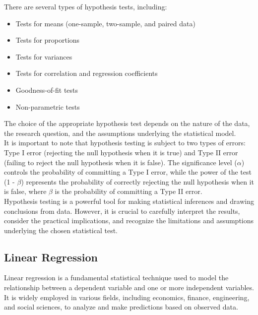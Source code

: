 There are several types of hypothesis tests, including:
\begin{itemize}
    \item Tests for means (one-sample, two-sample, and paired data)
    \item Tests for proportions
    \item Tests for variances
    \item Tests for correlation and regression coefficients
    \item Goodness-of-fit tests
    \item Non-parametric tests
\end{itemize}
The choice of the appropriate hypothesis test depends on the nature of the data, the research question, and the assumptions underlying the statistical model.\\

It is important to note that hypothesis testing is subject to two types of errors: Type I error (rejecting the null hypothesis when it is true) and Type II error (failing to reject the null hypothesis when it is false). The significance level ($\alpha$) controls the probability of committing a Type I error, while the power of the test (1 - $\beta$) represents the probability of correctly rejecting the null hypothesis when it is false, where $\beta$ is the probability of committing a Type II error.\\

Hypothesis testing is a powerful tool for making statistical inferences and drawing conclusions from data. However, it is crucial to carefully interpret the results, consider the practical implications, and recognize the limitations and assumptions underlying the chosen statistical test.

\subsection*{Linear Regression}
Linear regression is a fundamental statistical technique used to model the relationship between a dependent variable and one or more independent variables. It is widely employed in various fields, including economics, finance, engineering, and social sciences, to analyze and make predictions based on observed data.\\

